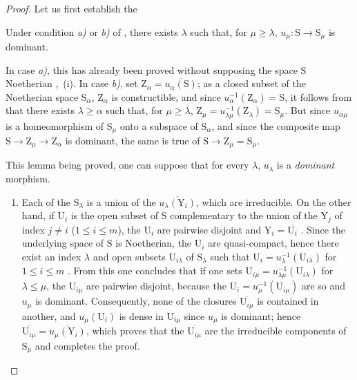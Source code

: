 \begin{proof}
Let us first establish the

\begin{lemma}[8.4.2.1]
\label{IV.8.4.2.1}
Under condition \emph{a)} or \emph{b)} of , there exists $\lambda$ such that, for $\mu\geqslant\lambda$, $u_\mu:\mathrm{S}\to\mathrm{S}_\mu$ is dominant.
\end{lemma}

In case \emph{a)}, this has already been proved without supposing the space $\mathrm{S}$ Noetherian ,~(i).
In case \emph{b)}, set $\mathrm{Z}_\alpha=\overline{u_\alpha(\mathrm{S})}$; as a closed subset of the Noetherian space $\mathrm{S}_\alpha$, $\mathrm{Z}_\alpha$ is constructible, and since $u_\alpha^{-1}(\mathrm{Z}_\alpha)=\mathrm{S}$, it follows from  that there exists $\lambda\geqslant\alpha$ such that, for $\mu\geqslant\lambda$, $\mathrm{Z}_\mu=u_{\lambda\mu}^{-1}(\mathrm{Z}_\lambda)=\mathrm{S}_\mu$.
But since $u_{\alpha\mu}$ is a homeomorphism of $\mathrm{S}_\mu$ onto a subspace of $\mathrm{S}_\alpha$, and since the composite map $\mathrm{S}\to\mathrm{Z}_\mu\to\mathrm{Z}_\alpha$ is dominant, the same is true of $\mathrm{S}\to\mathrm{Z}_\mu=\mathrm{S}_\mu$.

This lemma being proved, one can suppose that for every $\lambda$, $u_\lambda$ is a \emph{dominant} morphism.
\begin{enumerate}[label=(\roman*)]
  \item Each of the $\mathrm{S}_\lambda$ is a union of the $\overline{u_\lambda(\mathrm{Y}_i)}$, which are irreducible.
On the other hand, if $\mathrm{U}_i$ is the open subset of $\mathrm{S}$ complementary to the union of the $\mathrm{Y}_j$ of index $j\neq i$ ($1\leqslant i\leqslant m$), the $\mathrm{U}_i$ are pairwise disjoint and $\mathrm{Y}_i=\overline{\mathrm{U}_i}$ .
Since the underlying space of $\mathrm{S}$ is Noetherian, the $\mathrm{U}_i$ are quasi-compact, hence there exist an index $\lambda$ and open subsets $\mathrm{U}_{i\lambda}$ of $\mathrm{S}_\lambda$ such that $\mathrm{U}_i=u_\lambda^{-1}(\mathrm{U}_{i\lambda})$ for $1\leqslant i\leqslant m$ .
From this one concludes that if one sets $\mathrm{U}_{i\mu}=u_{\lambda\mu}^{-1}(\mathrm{U}_{i\lambda})$ for $\lambda\leqslant\mu$, the $\mathrm{U}_{i\mu}$ are pairwise disjoint, because the $\mathrm{U}_i=u_\mu^{-1}(\mathrm{U}_{i\mu})$ are so and $u_\mu$ is dominant.
Consequently, none of the closures $\overline{\mathrm{U}_{i\mu}}$ is contained in another, and $u_\mu(\mathrm{U}_i)$ is dense in $\mathrm{U}_{i\mu}$ since $u_\mu$ is dominant; hence $\overline{\mathrm{U}_{i\mu}}=\overline{u_\mu(\mathrm{Y}_i)}$, which proves that the $\overline{\mathrm{U}_{i\mu}}$ are the irreducible components of $\mathrm{S}_\mu$  and completes the proof.


\end{enumerate}
\end{proof}
